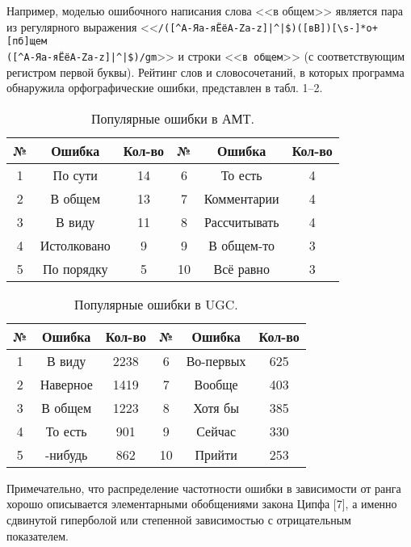Например, моделью ошибочного написания слова <<в общем>> является пара из регулярного выражения
\linebreak
<<\verb"/([^А-Яа-яЁёA-Za-z­]|^|$)([вВ])[\s-]*о+[пб]щем" \\ \verb"([^А-Яа-яЁёA-Za-z­]|^|$)/gm">> и строки
<<\verb"в общем">> (с соответствующим регистром первой буквы).
Рейтинг слов и словосочетаний, в которых программа обнаружила орфографические ошибки,
представлен в табл. 1--2.
\begin{table}[h]
\caption{\label{tab:amt_error}Популярные ошибки в АМТ.}
\begin{center}
\begin{tabular}{|c|c|c|c|c|c|}
\hline
{№} & {Ошибка} & {Кол-во} & {№} & {Ошибка} & {Кол-во} \\
\hline
1 & По сути  & 14       &  6 & То есть & 4 \\
2 & В общем & 13        &  7 & Комментарии & 4 \\
3 & В виду  & 11        &  8 & Рассчитывать & 4 \\
4 & Истолковано & 9     &  9 & В общем-то & 3 \\
5 & По порядку & 5      & 10 & Всё равно  & 3 \\
\hline
\end{tabular}
\end{center}
\end{table}
\begin{table}[h]
\caption{\label{tab:ugc_error}Популярные ошибки в UGC.}
\begin{center}
\begin{tabular}{|c|c|c|c|c|c|}
\hline
{№} & {Ошибка} & {Кол-во} & {№} & {Ошибка} & {Кол-во}\\
\hline
1 & В виду & 2238   &  6 & Во-первых & 625 \\
2 & Наверное & 1419 &  7 & Вообще & 403 \\
3 & В общем & 1223  &  8 & Хотя бы & 385 \\
4 & То есть & 901   &  9 & Сейчас & 330 \\
5 & -нибудь & 862   & 10 & Прийти  & 253 \\
\hline
\end{tabular}
\end{center}
\end{table}

Примечательно, что распределение частотности ошибки в зависимости от ранга хорошо описывается
элементарными обобщениями закона Ципфа [7],
а именно сдвинутой гиперболой или степенной зависимостью с отрицательным показателем.

